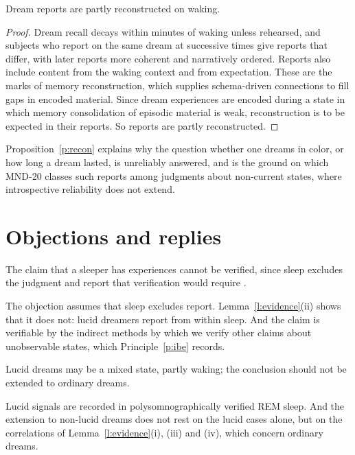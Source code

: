 \documentclass{situationist-preprint}
\begin{document}
\begin{proposition}\label{p:recon}
Dream reports are partly reconstructed on waking.
\end{proposition}

\begin{proof}
Dream recall decays within minutes of waking unless rehearsed, and subjects who report on the same dream at successive times give reports that differ, with later reports more coherent and narratively ordered. Reports also include content from the waking context and from expectation. These are the marks of memory reconstruction, which supplies schema-driven connections to fill gaps in encoded material. Since dream experiences are encoded during a state in which memory consolidation of episodic material is weak, reconstruction is to be expected in their reports. So reports are partly reconstructed.
\end{proof}

Proposition~\ref{p:recon} explains why the question whether one dreams in color, or how long a dream lasted, is unreliably answered, and is the ground on which MND-20 classes such reports among judgments about non-current states, where introspective reliability does not extend.

\section{Objections and replies}

\begin{objection}[Malcolm]\label{o:malc}
The claim that a sleeper has experiences cannot be verified, since sleep excludes the judgment and report that verification would require \citep{Malcolm1959}.
\end{objection}

\begin{reply}
The objection assumes that sleep excludes report. Lemma~\ref{l:evidence}(ii) shows that it does not: lucid dreamers report from within sleep. And the claim is verifiable by the indirect methods by which we verify other claims about unobservable states, which Principle~\ref{p:ibe} records.
\end{reply}

\begin{objection}[Lucidity]\label{o:lucid}
Lucid dreams may be a mixed state, partly waking; the conclusion should not be extended to ordinary dreams.
\end{objection}

\begin{reply}
Lucid signals are recorded in polysomnographically verified REM sleep. And the extension to non-lucid dreams does not rest on the lucid cases alone, but on the correlations of Lemma~\ref{l:evidence}(i), (iii) and (iv), which concern ordinary dreams.
\end{reply}
\end{document}
